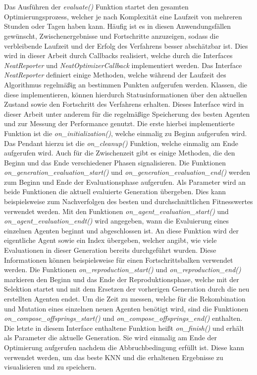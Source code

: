 \\\\
Das Ausführen der \emph{evaluate()} Funktion startet den gesamten Optimierungsprozess, welcher je nach Komplexität eine Laufzeit von mehreren Stunden oder Tagen haben kann. Häufig ist es in diesen Anwendungsfällen gewünscht, Zwischenergebnisse und Fortschritte anzuzeigen, sodass die verbleibende Laufzeit und der Erfolg des Verfahrens besser abschätzbar ist. Dies wird in dieser Arbeit durch Callbacks realisiert, welche durch die Interfaces \emph{NeatReporter} und \emph{NeatOptimizerCallback} implementiert werden. Das Interface \emph{NeatReporter} definiert einige Methoden, welche während der Laufzeit des Algorithmus regelmäßig an bestimmen Punkten aufgerufen werden. Klassen, die diese implementieren, können hierdurch Statusinformationen über den aktuellen Zustand sowie den Fortschritt des Verfahrens erhalten. 
Dieses Interface wird in dieser Arbeit unter anderem für die regelmäßige Speicherung des besten Agenten und zur Messung der Performance genutzt. Die erste hierbei implementierte Funktion ist die \emph{on\_initialization()}, welche einmalig zu Beginn aufgerufen wird. Das Pendant hierzu ist die \emph{on\_cleanup()} Funktion, welche einmalig am Ende aufgerufen wird. Auch für die Zwischenzeit gibt es einige Methoden, die den Beginn und das Ende verschiedener Phasen signalisieren. Die Funktionen \emph{on\_generation\_evaluation\_start()} und \emph{on\_generation\_evaluation\_end()} werden zum Beginn und Ende der Evaluationsphase aufgerufen. Als Parameter wird an beide Funktionen die aktuell evaluierte Generation übergeben. Dies kann beispielsweise zum Nachverfolgen des besten und durchschnittlichen Fitnesswertes verwendet werden. Mit den Funktionen \emph{on\_agent\_evaluation\_start()} und \emph{on\_agent\_evaluation\_endt()} wird angegeben, wann die Evaluierung eines einzelnen Agenten beginnt und abgeschlossen ist. An diese Funktion wird der eigentliche Agent sowie ein Index übergeben, welcher angibt, wie viele Evaluationen in dieser Generation bereits durchgeführt wurden. Diese Informationen können beispielsweise für einen Fortschrittsbalken verwendet werden. Die Funktionen \emph{on\_reproduction\_start()} und \emph{on\_reproduction\_end()} markieren den Beginn und das Ende der Reproduktionsphase, welche mit der Selektion startet und mit dem Ersetzen der vorherigen Generation durch die neu erstellten Agenten endet. Um die Zeit zu messen, welche für die Rekombination und Mutation eines einzelnen neuen Agenten benötigt wird, sind die Funktionen \emph{on\_compose\_offsprings\_start()} und  \emph{on\_compose\_offsprings\_end()} enthalten. Die letzte in diesem Interface enthaltene Funktion heißt \emph{on\_finish()} und erhält als Parameter die aktuelle Generation. Sie wird einmalig am Ende der Optimierung aufgerufen nachdem die Abbruchbedingung erfüllt ist. Diese kann verwendet werden, um das beste \ac{KNN} und die erhaltenen Ergebnisse zu visualisieren und zu speichern.

